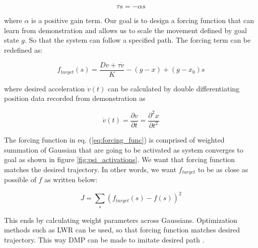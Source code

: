 \documentclass[sigconf]{acmart}
\begin{document}
\begin{equation}
	\tau \dot{s} = - \alpha s
\end{equation}

where $\alpha$ is a positive gain term. Our goal is to design a forcing function that can learn from demonstration and allows us to scale the movement defined by goal state $g$. So that the system can follow a specified path. The forcing term can be redefined as:

\begin{equation}
	f_{target}(s) = \frac{D v + \tau \dot{v}}{K} - (g - x) +  (g - x_0) s
\end{equation}

where desired acceleration $\dot{v}(t)$ can be calculated by double differentiating position data recorded from demonstration as

\begin{equation}
	\dot{v}(t) = \frac{\partial v}{\partial t} = \frac{\partial^2 x}{\partial t^2}
\end{equation}

The forcing function in eq. (\ref{eq:forcing_func}) is comprised of weighted summation of Gaussian that are going to be activated as system converges to goal as shown in figure \ref{fig:psi_activations}. We want that forcing function matches the desired trajectory. In other words, we want $f_{target}$ to be as close as possible of $f$ as written below:

\begin{equation}
	J = \sum_{s} \left( f_{target}(s) - f(s) \right)^2
\end{equation}

This ends by calculating weight parameters across Gaussians. Optimization methods such as LWR \cite{vijayakumar2000locally} can be used, so that forcing function matches desired trajectory. This way DMP can be made to imitate desired path \cite{pastor2009learning}.
\end{document}
